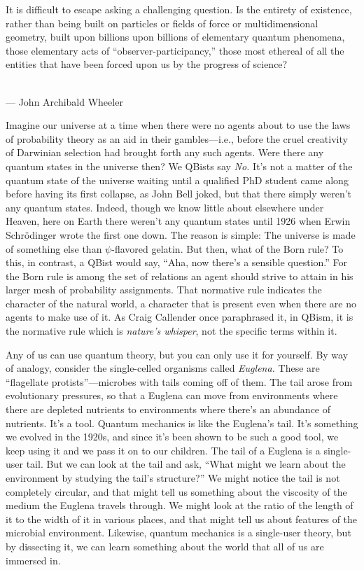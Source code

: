 \documentclass[aps,pra,superscriptaddress,12pt,tightenlines,nofootinbib]{revtex4-2}
\begin{document}
\begin{flushright}
\baselineskip=13pt
\parbox{2.8in}{\baselineskip=13pt
\small It is difficult to escape asking a challenging question. Is the
entirety of existence, rather than being built on particles or fields
of force or multidimensional geometry, built upon billions upon
billions of elementary quantum phenomena, those elementary acts of
``observer-participancy,'' those most ethereal of all the entities
that have been forced upon us by the progress of science?}
\medskip\\
\small  --- John Archibald Wheeler
\end{flushright}

Imagine our universe at a time when there were no agents about to use
the laws of probability theory as an aid in their gambles---i.e.,
before the cruel creativity of Darwinian selection had brought forth
any such agents.  Were there any quantum states in the universe then?
We QBists say {\it No.} It's not a matter of the quantum state of
the universe waiting until a qualified PhD student came along before
having its first collapse, as John Bell joked, but that there simply
weren't any quantum states.  Indeed, though we know little about
elsewhere under Heaven, here on Earth there weren't any quantum states
until 1926 when Erwin Schr\"odinger wrote the first one down. The
reason is simple: The universe is made of something else than
$\psi$-flavored gelatin. But then, what of the Born rule? To this, in
contrast, a QBist would say, ``Aha, now there's a sensible question.''
For the Born rule is among the set of relations an agent should strive
to attain in his larger mesh of probability assignments. That
normative rule indicates the character of the natural world, a
character that is present even when there are no agents to make use of
it. As Craig Callender once paraphrased it, in QBism, it is the normative rule which is {\it nature's whisper}, not
the specific terms within it.

Any of us can use quantum theory, but you can only use it for yourself. By way of analogy, consider the single-celled organisms called {\it Euglena.}  These are ``flagellate protists''---microbes with tails coming off of them. The tail arose from evolutionary pressures, so that a Euglena can move from environments where there are depleted nutrients to environments where there's an abundance of nutrients. It's a tool. Quantum mechanics is like the Euglena's tail. It's something we evolved in the 1920s, and since it's been shown to be such a good tool, we keep using it and we pass it on to our children. The tail of a Euglena is a single-user tail. But we can look at the tail and ask, ``What might we learn about the environment by studying the tail's structure?'' We might notice the tail is not completely circular, and that might tell us something about the viscosity of the medium the Euglena travels through. We might look at the ratio of the length of it to the width of it in various places, and that might tell us about features of the microbial environment. Likewise, quantum mechanics is a single-user theory, but by dissecting it, we can learn something about the world that all of us are immersed in.
\end{document}
